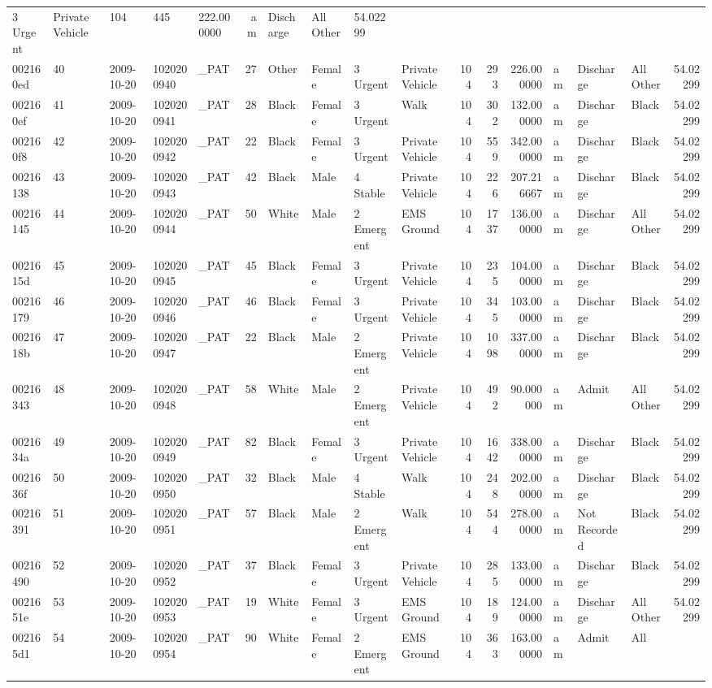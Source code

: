 \documentclass[]{elsarticle} %
\begin{document}
\begin{longtable}[]{@{}lllllrllllrrrlllr@{}}
3 Urgent & Private Vehicle & 104 & 445 & 222.000000 & am & Discharge &
All Other & 54.02299\tabularnewline
002160ed & 40 & 2009-10-20 & 1020200940 & \_PAT & 27 & Other & Female &
3 Urgent & Private Vehicle & 104 & 293 & 226.000000 & am & Discharge &
All Other & 54.02299\tabularnewline
002160ef & 41 & 2009-10-20 & 1020200941 & \_PAT & 28 & Black & Female &
3 Urgent & Walk & 104 & 302 & 132.000000 & am & Discharge & Black &
54.02299\tabularnewline
002160f8 & 42 & 2009-10-20 & 1020200942 & \_PAT & 22 & Black & Female &
3 Urgent & Private Vehicle & 104 & 559 & 342.000000 & am & Discharge &
Black & 54.02299\tabularnewline
00216138 & 43 & 2009-10-20 & 1020200943 & \_PAT & 42 & Black & Male & 4
Stable & Private Vehicle & 104 & 226 & 207.216667 & am & Discharge &
Black & 54.02299\tabularnewline
00216145 & 44 & 2009-10-20 & 1020200944 & \_PAT & 50 & White & Male & 2
Emergent & EMS Ground & 104 & 1737 & 136.000000 & am & Discharge & All
Other & 54.02299\tabularnewline
0021615d & 45 & 2009-10-20 & 1020200945 & \_PAT & 45 & Black & Female &
3 Urgent & Private Vehicle & 104 & 235 & 104.000000 & am & Discharge &
Black & 54.02299\tabularnewline
00216179 & 46 & 2009-10-20 & 1020200946 & \_PAT & 46 & Black & Female &
3 Urgent & Private Vehicle & 104 & 345 & 103.000000 & am & Discharge &
Black & 54.02299\tabularnewline
0021618b & 47 & 2009-10-20 & 1020200947 & \_PAT & 22 & Black & Male & 2
Emergent & Private Vehicle & 104 & 1098 & 337.000000 & am & Discharge &
Black & 54.02299\tabularnewline
00216343 & 48 & 2009-10-20 & 1020200948 & \_PAT & 58 & White & Male & 2
Emergent & Private Vehicle & 104 & 492 & 90.000000 & am & Admit & All
Other & 54.02299\tabularnewline
0021634a & 49 & 2009-10-20 & 1020200949 & \_PAT & 82 & Black & Female &
3 Urgent & Private Vehicle & 104 & 1642 & 338.000000 & am & Discharge &
Black & 54.02299\tabularnewline
0021636f & 50 & 2009-10-20 & 1020200950 & \_PAT & 32 & Black & Male & 4
Stable & Walk & 104 & 248 & 202.000000 & am & Discharge & Black &
54.02299\tabularnewline
00216391 & 51 & 2009-10-20 & 1020200951 & \_PAT & 57 & Black & Male & 2
Emergent & Walk & 104 & 544 & 278.000000 & am & Not Recorded & Black &
54.02299\tabularnewline
00216490 & 52 & 2009-10-20 & 1020200952 & \_PAT & 37 & Black & Female &
3 Urgent & Private Vehicle & 104 & 285 & 133.000000 & am & Discharge &
Black & 54.02299\tabularnewline
0021651e & 53 & 2009-10-20 & 1020200953 & \_PAT & 19 & White & Female &
3 Urgent & EMS Ground & 104 & 189 & 124.000000 & am & Discharge & All
Other & 54.02299\tabularnewline
002165d1 & 54 & 2009-10-20 & 1020200954 & \_PAT & 90 & White & Female &
2 Emergent & EMS Ground & 104 & 363 & 163.000000 & am & Admit & All

\end{longtable}
\end{document}
